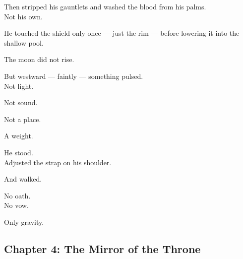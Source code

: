 \documentclass[9pt]{article}
\begin{document}
Then stripped his gauntlets and washed the blood from his palms.\\
Not his own.

He touched the shield only once — just the rim — before lowering it into the shallow pool.

\vspace{1em}

The moon did not rise.

But westward — faintly — something pulsed.\\
Not light.

Not sound.

Not a place.

A weight.

\vspace{1em}

He stood.\\
Adjusted the strap on his shoulder.

And walked.

\vspace{1em}

No oath.\\
No vow.

Only gravity.

\newpage

\subsection*{Chapter 4: The Mirror of the Throne}

\vspace{1in}
\end{document}
